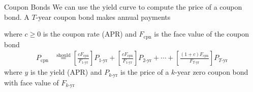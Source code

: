\documentclass{beamer}
\newcommand{\zcb}[1]{#1\text{-yr}}
\newcommand{\should}{\overset{\text{should}}{=}}
\begin{document}
\begin{frame}{Coupon Bonds}
	We can use the yield curve to compute the price of a coupon bond. A $T$-year coupon bond makes annual payments
	\begin{figure}[H]
		\begin{center}
		\end{center}
	\end{figure}
where $c\geq0$ is the coupon rate (APR) and $F_{\text{cpn}}$ is the face value of the coupon bond
\begin{align*}
	P_{\text{cpn}}&\should \left[\frac{cF_{\text{cpn}}}{F_{\zcb{1}}}\right]P_{\zcb{1}}+\left[\frac{cF_{\text{cpn}}}{F_{\zcb{1}}}\right]P_{\zcb{2}}+\cdots+\left[\frac{(1+c)F_{\text{cpn}}}{F_{\zcb{T}}}\right]P_{\zcb{T}}
\end{align*}
where $y$ is the yield (APR) and $P_{\zcb{k}}$ is the price of a $k$-year zero coupon bond with face value of $F_{\zcb{k}}$
\end{frame}
\end{document}
